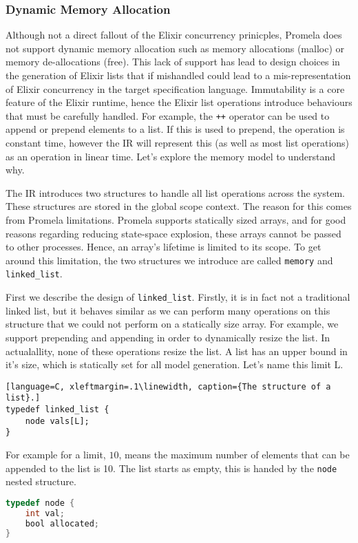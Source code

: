 \subsubsection{Dynamic Memory Allocation}
Although not a direct fallout of the Elixir concurrency prinicples, Promela does not support dynamic memory allocation such as memory allocations (malloc) or memory de-allocations (free). This lack of support has lead to design choices in the generation of Elixir lists that if mishandled could lead to a mis-representation of Elixir concurrency in the target specification language. Immutability is a core feature of the Elixir runtime, hence the Elixir list operations introduce behaviours that must be carefully handled. For example, the \texttt{++} operator can be used to append or prepend elements to a list. If this is used to prepend, the operation is constant time, however the IR will represent this (as well as most list operations) as an operation in linear time. Let's explore the memory model to understand why. 
\par
The IR introduces two structures to handle all list operations across the system. These structures are stored in the global scope context. The reason for this comes from Promela limitations. Promela supports statically sized arrays, and for good reasons regarding reducing state-space explosion, these arrays cannot be passed to other processes. Hence, an array's lifetime is limited to its scope. To get around this limitation, the two structures we introduce are called \texttt{memory} and \texttt{linked\_list}.
\par
First we describe the design of \texttt{linked\_list}. Firstly, it is in fact not a traditional linked list, but it behaves similar as we can perform many operations on this structure that we could not perform on a statically size array. For example, we support prepending and appending in order to dynamically resize the list. In actualallity, none of these operations resize the list. A list has an upper bound in it's size, which is statically set for all model generation. Let's name this limit L.
\begin{lstlisting}[language=C, xleftmargin=.1\linewidth, caption={The structure of a list}.]
typedef linked_list {
    node vals[L];
}
\end{lstlisting}
For example for a limit, $10$, means the maximum number of elements that can be appended to the list is 10. The list starts as empty, this is handed by the \texttt{node} nested structure.
\begin{lstlisting}[language=C, xleftmargin=.1\linewidth, caption={Example of a list node typed `int'.}]
typedef node {
    int val;
    bool allocated;
}
\end{lstlisting}
